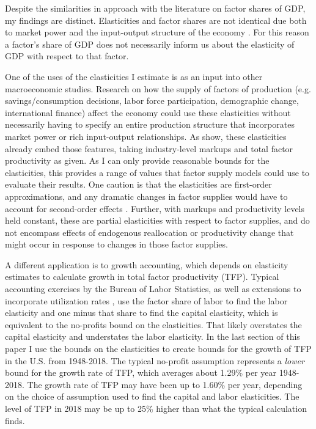 \documentclass[11pt]{article}
\begin{document}
Despite the similarities in approach with the literature on factor shares of GDP, my findings are distinct. Elasticities and factor shares are not identical due both to market power and the input-output structure of the economy \citep{bfshortnote,bfprodge}. For this reason a factor's share of GDP does not necessarily inform us about the elasticity of GDP with respect to that factor.

One of the uses of the elasticities I estimate is as an input into other macroeconomic studies. Research on how the supply of factors of production (e.g. savings/consumption decisions, labor force participation, demographic change, international finance) affect the economy could use these elasticities without necessarily having to specify an entire production structure that incorporates market power or rich input-output relationships. As \cite{bfshortnote,bfprodge} show, these elasticities already embed those features, taking industry-level markups and total factor productivity as given. As I can only provide reasonable bounds for the elasticities, this provides a range of values that factor supply models could use to evaluate their results. One caution is that the elasticities are first-order approximations, and any dramatic changes in factor supplies would have to account for second-order effects \citep{bfmicro}. Further, with markups and productivity levels held constant, these are partial elasticities with respect to factor supplies, and do not encompass effects of endogenous reallocation or productivity change that might occur in response to changes in those factor supplies. 

A different application is to growth accounting, which depends on elasticity estimates to calculate growth in total factor productivity (TFP). Typical accounting exercises by the Bureau of Labor Statistics, as well as extensions to incorporate utilization rates \citep{kfb2006,fernald2014}, use the factor share of labor to find the labor elasticity and one minus that share to find the capital elasticity, which is equivalent to the no-profits bound on the elasticities. That likely overstates the capital elasticity and understates the labor elasticity. In the last section of this paper I use the bounds on the elasticities to create bounds for the growth of TFP in the U.S. from 1948-2018. The typical no-profit assumption represents a \textit{lower} bound for the growth rate of TFP, which averages about 1.29\% per year 1948-2018. The growth rate of TFP may have been up to 1.60\% per year, depending on the choice of assumption used to find the capital and labor elasticities. The level of TFP in 2018 may be up to 25\% higher than what the typical calculation finds. 
\end{document}
